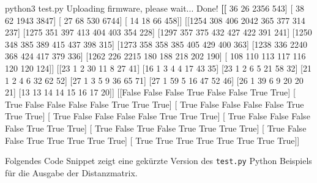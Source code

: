 \documentclass[
  11pt,
  a4paperpaper,
  oneside, openany  ,captions=tableheading
]{scrbook}
\newenvironment{Shaded}{\begin{snugshade}}{\end{snugshade}}
\newcommand{\BuiltInTok}[1]{\textcolor[rgb]{0.00,0.23,0.31}{#1}}
\newcommand{\ErrorTok}[1]{\textcolor[rgb]{0.68,0.00,0.00}{#1}}
\newcommand{\ExtensionTok}[1]{\textcolor[rgb]{0.00,0.23,0.31}{#1}}
\newcommand{\KeywordTok}[1]{\textcolor[rgb]{0.00,0.23,0.31}{\textbf{#1}}}
\newcommand{\NormalTok}[1]{\textcolor[rgb]{0.00,0.23,0.31}{#1}}
\theoremstyle{definition}
\theoremstyle{remark}
\begin{document}
\begin{Shaded}
\begin{Highlighting}[]
\ExtensionTok{python3}\NormalTok{ test.py }
\ExtensionTok{Uploading}\NormalTok{ firmware, please wait...}
\ExtensionTok{Done!}
\KeywordTok{[[}\NormalTok{  36   26 2356  }\ErrorTok{543}\ExtensionTok{]}
 \BuiltInTok{[}\NormalTok{  38   62 1943 }\ErrorTok{3847}\ExtensionTok{]}
 \BuiltInTok{[}\NormalTok{  27   68  530 }\ErrorTok{6744}\ExtensionTok{]}
 \BuiltInTok{[}\NormalTok{  14   18   66  }\ErrorTok{458]]} \ExtensionTok{[[1254}\NormalTok{  308  406 2042  365  377  314  237]}
 \ExtensionTok{[1275}\NormalTok{  351  397  413  404  403  354  228]}
 \ExtensionTok{[1297}\NormalTok{  357  375  432  427  422  391  241]}
 \ExtensionTok{[1250}\NormalTok{  348  385  389  415  437  398  315]}
 \ExtensionTok{[1273}\NormalTok{  358  358  385  405  429  400  363]}
 \ExtensionTok{[1238}\NormalTok{  336 2240  368  424  417  379  336]}
 \ExtensionTok{[1262}\NormalTok{  226 2215  180  188  218  202  190]}
 \BuiltInTok{[}\NormalTok{ 108  110  113  }\ErrorTok{117}  \ExtensionTok{116}\NormalTok{  120  120  124]] [[23  1  2 30 11  8 27 41]}
 \ExtensionTok{[16}\NormalTok{  1  3  4  4 17 43 35]}
 \ExtensionTok{[23}\NormalTok{  1  2  6  5 21 58 32]}
 \ExtensionTok{[21}\NormalTok{  1  2  4  6 32 62 52]}
 \ExtensionTok{[27}\NormalTok{  1  3  5  9 36 65 71]}
 \ExtensionTok{[27}\NormalTok{  1 59  5 16 47 52 46]}
 \ExtensionTok{[26}\NormalTok{  1 39  6  9 20 20 21]}
 \ExtensionTok{[13}\NormalTok{ 13 14 14 15 16 17 20]] [[False False False  True False False  True  True]}
 \BuiltInTok{[}\NormalTok{ True False False }\ErrorTok{False} \ExtensionTok{False}\NormalTok{  True  True  True]}
 \BuiltInTok{[}\NormalTok{ True False False }\ErrorTok{False} \ExtensionTok{False}\NormalTok{  True  True  True]}
 \BuiltInTok{[}\NormalTok{ True False False }\ErrorTok{False} \ExtensionTok{False}\NormalTok{  True  True  True]}
 \BuiltInTok{[}\NormalTok{ True False False }\ErrorTok{False} \ExtensionTok{False}\NormalTok{  True  True  True]}
 \BuiltInTok{[}\NormalTok{ True False  True }\ErrorTok{False}  \ExtensionTok{True}\NormalTok{  True  True  True]}
 \BuiltInTok{[}\NormalTok{ True False False  }\ErrorTok{True}  \ExtensionTok{True}\NormalTok{  True  True  True]}
 \BuiltInTok{[}\NormalTok{ True  True  True  }\ErrorTok{True}  \ExtensionTok{True}\NormalTok{  True  True  True]]}
\end{Highlighting}
\end{Shaded}

Folgendes Code Snippet zeigt eine gekürzte Version des \texttt{test.py}
Python Beispiels für die Ausgabe der Distanzmatrix.
\end{document}
